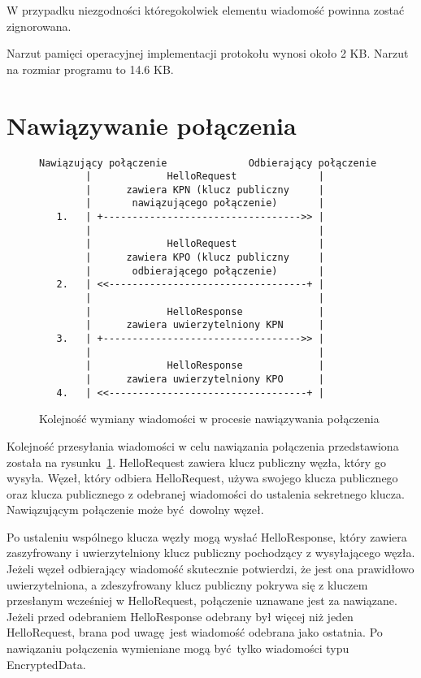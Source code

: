 W przypadku niezgodności któregokolwiek elementu wiadomość powinna zostać zignorowana.

Narzut pamięci operacyjnej implementacji protokołu wynosi około 2 KB. Narzut na rozmiar programu to 14.6 KB.

\section{Nawiązywanie połączenia}

\begin{figure}[h]
\centering
\begin{BVerbatim}
Nawiązujący połączenie              Odbierający połączenie
        |             HelloRequest              |
        |      zawiera KPN (klucz publiczny     |
        |       nawiązującego połączenie)       |
   1.   | +---------------------------------->> |
        |                                       |
        |             HelloRequest              |
        |      zawiera KPO (klucz publiczny     |
        |       odbierającego połączenie)       |
   2.   | <<----------------------------------+ |
        |                                       |
        |             HelloResponse             |
        |      zawiera uwierzytelniony KPN      |
   3.   | +---------------------------------->> |
        |                                       |
        |             HelloResponse             |
        |      zawiera uwierzytelniony KPO      |
   4.   | <<----------------------------------+ |
\end{BVerbatim}
\caption{Kolejność wymiany wiadomości w procesie nawiązywania połączenia}
\label{fig:handshake}
\end{figure}

Kolejność przesyłania wiadomości w celu nawiązania połączenia przedstawiona została na rysunku~\ref{fig:handshake}. HelloRequest zawiera klucz publiczny węzła, który go wysyła. Węzeł, który odbiera HelloRequest, używa swojego klucza publicznego oraz klucza publicznego z odebranej wiadomości do ustalenia sekretnego klucza. Nawiązującym połączenie może być dowolny węzeł.

Po ustaleniu wspólnego klucza węzły mogą wysłać HelloResponse, który zawiera zaszyfrowany i uwierzytelniony klucz publiczny pochodzący z wysyłającego węzła. Jeżeli węzeł odbierający wiadomość skutecznie potwierdzi, że jest ona prawidłowo uwierzytelniona, a zdeszyfrowany klucz publiczny pokrywa się z kluczem przesłanym wcześniej w HelloRequest, połączenie uznawane jest za nawiązane. Jeżeli przed odebraniem HelloResponse odebrany był więcej niż jeden HelloRequest, brana pod uwagę jest wiadomość odebrana jako ostatnia. Po nawiązaniu połączenia wymieniane mogą być tylko wiadomości typu EncryptedData.

